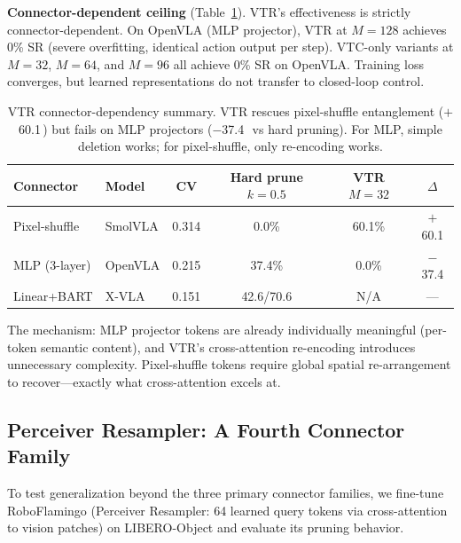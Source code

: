 \documentclass[10pt,letterpaper]{article}
\newcommand{\pp}{\,\text{pp}}
\begin{document}

\textbf{Connector-dependent ceiling} (Table~\ref{tab:vtr_connector}). VTR's effectiveness is strictly connector-dependent. On OpenVLA (MLP projector), VTR at $M\!=\!128$ achieves 0\% SR (severe overfitting, identical action output per step). VTC-only variants at $M\!=\!32$, $M\!=\!64$, and $M\!=\!96$ all achieve 0\% SR on OpenVLA. Training loss converges, but learned representations do not transfer to closed-loop control.

\begin{table}[t]
\centering
\caption{VTR connector-dependency summary. VTR rescues pixel-shuffle entanglement ($+$60.1\pp) but fails on MLP projectors ($-$37.4\pp\ vs hard pruning). For MLP, simple deletion works; for pixel-shuffle, only re-encoding works.}
\label{tab:vtr_connector}
\small
\begin{tabular}{llcccc}
\toprule
Connector & Model & CV & Hard prune $k\!=\!0.5$ & VTR $M\!=\!32$ & $\Delta$ \\
\midrule
Pixel-shuffle & SmolVLA & 0.314 & 0.0\% & 60.1\% & $+$60.1 \\
MLP (3-layer) & OpenVLA & 0.215 & 37.4\% & 0.0\% & $-$37.4 \\
Linear+BART & X-VLA & 0.151 & 42.6/70.6 & N/A & --- \\
\bottomrule
\end{tabular}
\end{table}

The mechanism: MLP projector tokens are already individually meaningful (per-token semantic content), and VTR's cross-attention re-encoding introduces unnecessary complexity. Pixel-shuffle tokens require global spatial re-arrangement to recover---exactly what cross-attention excels at.

\subsection{Perceiver Resampler: A Fourth Connector Family}
\label{sec:perceiver}

To test generalization beyond the three primary connector families, we fine-tune RoboFlamingo (Perceiver Resampler: 64 learned query tokens via cross-attention to vision patches) on LIBERO-Object and evaluate its pruning behavior.
\end{document}
